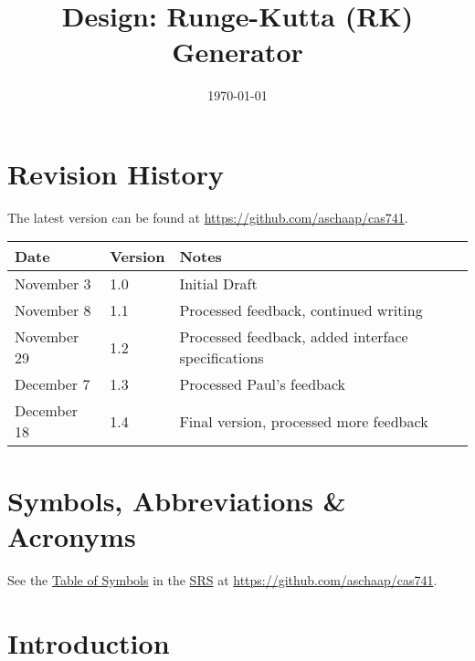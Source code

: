 \documentclass[12pt, titlepage]{article}
\begin{document}
\title{Design: Runge-Kutta (RK) Generator} 
\date{\today}

\maketitle


\section{Revision History}

The latest version can be found at \url{https://github.com/aschaap/cas741}.\\

\noindent
\begin{tabularx}{\textwidth}{p{3cm}p{2cm}X}
\toprule {\bf Date} & {\bf Version} & {\bf Notes}\\
\midrule
November 3 & 1.0 & Initial Draft\\
November 8 & 1.1 & Processed feedback, continued writing\\
November 29 & 1.2 & Processed feedback, added interface specifications\\
December 7 & 1.3 & Processed Paul's feedback\\
December 18 & 1.4 & Final version, processed more feedback\\
\bottomrule
\end{tabularx}

\newpage

\section{Symbols, Abbreviations \& Acronyms}
See the \href{../SRS/CA.pdf#ssec:symbols}{Table of Symbols} in the 
\href{../SRS/CA.pdf}{SRS} at 
\url{https://github.com/aschaap/cas741}.


\newpage

\tableofcontents

%

\newpage


\section{Introduction}

\end{document}
